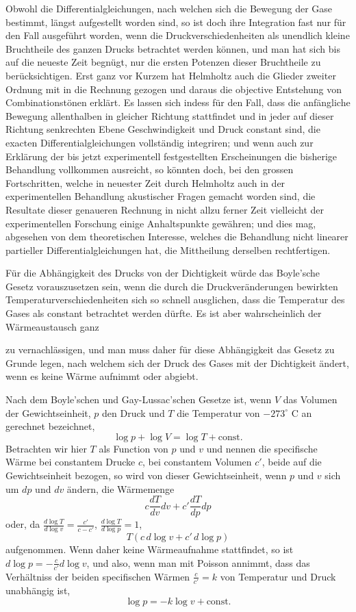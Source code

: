 \documentclass[12pt,a4paper]{book}
\theoremstyle{definition}
\theoremstyle{remark}
\begin{document}
Obwohl die Differentialgleichungen, nach welchen sich die Bewegung der Gase bestimmt, l\"angst aufgestellt worden sind, so ist doch ihre Integration fast nur f\"ur den Fall ausgef\"uhrt worden, wenn die Druckverschiedenheiten als unendlich kleine Bruchtheile des ganzen Drucks betrachtet werden k\"onnen, und man hat sich bis auf die neueste Zeit begn\"ugt, nur die ersten Potenzen dieser Bruchtheile zu ber\"ucksichtigen. Erst ganz vor Kurzem hat Helmholtz auch die Glieder zweiter Ordnung mit in die Rechnung gezogen und daraus die objective Entstehung von Combinationst\"onen erkl\"art. Es lassen sich indess f\"ur den Fall, dass die anf\"angliche Bewegung allenthalben in gleicher Richtung stattfindet und in jeder auf dieser Richtung senkrechten Ebene Geschwindigkeit und Druck constant sind, die exacten Differentialgleichungen vollst\"andig integriren; und wenn auch zur Erkl\"arung der bis jetzt experimentell festgestellten Erscheinungen die bisherige Behandlung vollkommen ausreicht, so k\"onnten doch, bei den grossen Fortschritten, welche in neuester Zeit durch Helmholtz auch in der experimentellen Behandlung akustischer Fragen gemacht worden sind, die Resultate dieser genaueren Rechnung in nicht allzu ferner Zeit vielleicht der experimentellen Forschung einige Anhaltspunkte gew\"ahren; und dies mag, abgesehen von dem theoretischen Interesse, welches die Behandlung nicht linearer partieller Differentialgleichungen hat, die Mittheilung derselben rechtfertigen.

F\"ur die Abh\"angigkeit des Drucks von der Dichtigkeit w\"urde das Boyle'sche Gesetz vorauszusetzen sein, wenn die durch die Druckver\"anderungen bewirkten Temperaturverschiedenheiten sich so schnell ausglichen, dass die Temperatur des Gases als constant betrachtet werden d\"urfte. Es ist aber wahrscheinlich der W\"armeaustausch ganz

zu vernachl\"assigen, und man muss daher f\"ur diese Abh\"angigkeit das Gesetz zu Grunde legen, nach welchem sich der Druck des Gases mit der Dichtigkeit \"andert, wenn es keine W\"arme aufnimmt oder abgiebt.

Nach dem Boyle'schen und Gay-Lussac'schen Gesetze ist, wenn $V$ das Volumen der Gewichtseinheit, $p$ den Druck und $T$ die Temperatur von $-273^{\circ}$ C an gerechnet bezeichnet,
\[
\log p + \log V = \log T + \text{const.}
\]
Betrachten wir hier $T$ als Function von $p$ und $v$ und nennen die specifische W\"arme bei constantem Drucke $c$, bei constantem Volumen $c'$, beide auf die Gewichtseinheit bezogen, so wird von dieser Gewichtseinheit, wenn $p$ und $v$ sich um $dp$ und $dv$ \"andern, die W\"armemenge
\[
c\frac{dT}{dv}dv + c'\frac{dT}{dp}dp
\]
oder, da $\frac{d\log T}{d\log v} = \frac{c'}{c-c'}$, $\frac{d\log T}{d\log p} = 1$,
\[
T(c\,d\log v + c'\,d\log p)
\]
aufgenommen. Wenn daher keine W\"armeaufnahme stattfindet, so ist $d\log p = -\frac{c}{c'}d\log v$, und also, wenn man mit Poisson annimmt, dass das Verh\"altniss der beiden specifischen W\"armen $\frac{c}{c'} = k$ von Temperatur und Druck unabh\"angig ist,
\[
\log p = -k\log v + \text{const.}
\]
\end{document}
